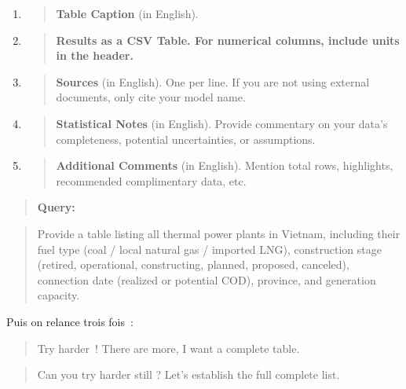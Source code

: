 \documentclass[a4paper,11pt]{report}
\begin{document}
\begin{enumerate}
\def\labelenumi{\arabic{enumi}.}
\item
  \begin{quote}
  \textbf{\textbf{Table Caption}} (in English).
  \end{quote}
\item
  \begin{quote}
  \textbf{\textbf{Results as a CSV Table. }\textbf{For numerical columns, include units in the header.}}
  \end{quote}
\item
  \begin{quote}
  \textbf{\textbf{Sources}} (in English). One per line. If you are not using external documents, only cite your model name.
  \end{quote}
\item
  \begin{quote}
  \textbf{\textbf{Statistical Notes}} (in English). Provide commentary on your data's completeness, potential uncertainties, or assumptions.
  \end{quote}
\item
  \begin{quote}
  \textbf{\textbf{Additional Comments}} (in English). Mention total rows, highlights, recommended complimentary data, etc.
  \end{quote}
\end{enumerate}

\begin{quote}
\textbf{\textbf{Query:}}
\end{quote}

\begin{quote}
Provide a table listing all thermal power plants in Vietnam, including their fuel type (coal / local natural gas / imported LNG), construction stage (retired, operational, constructing, planned, proposed, canceled), connection date (realized or potential COD), province, and generation capacity.
\end{quote}

Puis on relance trois fois~:

\begin{quote}
Try harder~! There are more, I want a complete table.
\end{quote}

\begin{quote}
Can you try harder still ? Let's establish the full complete list.
\end{quote}
\end{document}
